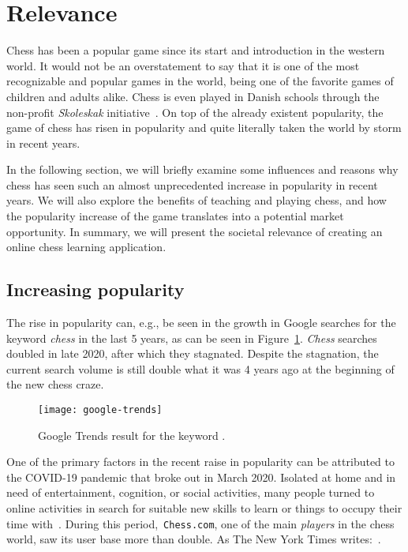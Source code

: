\section{Relevance}\label{sec:relevance}

Chess has been a popular game since its start and introduction in the western world.
It would not be an overstatement to say that it is one of the most recognizable and popular games in the world, being
one of the favorite games of children and adults alike.
Chess is even played in Danish schools through the non-profit \textit{Skoleskak} initiative~\cite{skoleskak2024}.
On top of the already existent popularity, the game of chess has risen in popularity and quite literally taken
the world by storm in recent years.

In the following section, we will briefly examine some influences and reasons why chess has seen such an almost
unprecedented increase in popularity in recent years.
We will also explore the benefits of teaching and playing chess, and how the popularity increase of the game translates
into a potential market opportunity.
In summary, we will present the societal relevance of creating an online chess learning application.

\subsection{Increasing popularity}\label{subsec:increasing-popularity}

The rise in popularity can, e.g., be seen in the growth in Google searches for the keyword \textit{chess} in the last 5
years, as can be seen in Figure~\ref{fig:google-trends}.
\textit{Chess} searches doubled in late 2020, after which they stagnated.
Despite the stagnation, the current search volume is still double what it was 4 years ago at the beginning of the new
chess craze.

\begin{figure}
    \centering
    \texttt{[image: google-trends]}
    \caption{Google Trends result for the keyword .}\label{fig:google-trends}
\end{figure}

One of the primary factors in the recent raise in popularity can be attributed to the COVID-19 pandemic that broke out
in March 2020.
Isolated at home and in need of entertainment, cognition, or social activities, many people turned to online activities
in search for suitable new skills to learn or things to occupy their time with~\cite{nyt2022}.
During this period,~\verb|Chess.com|, one of the main \textit{players} in the chess world, saw its user base more than
double.
As The New York Times writes:~.

